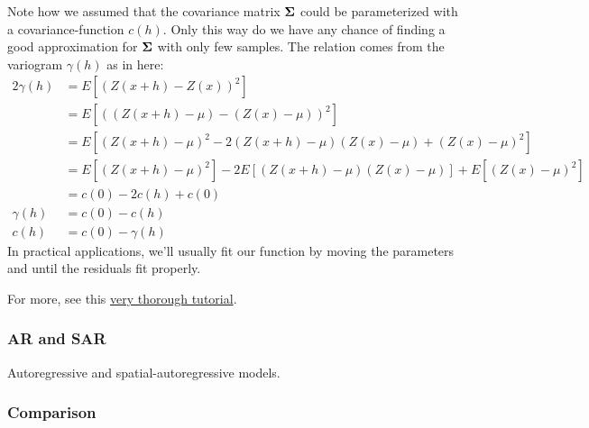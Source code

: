 Note how we assumed that the covariance matrix $\mathbf{\Sigma}$ could be parameterized with a covariance-function $c(h)$. Only this way do we have any chance of finding a good approximation for $\mathbf{\Sigma}$ with only few samples.
The relation  comes from the variogram $\gamma(h)$ as in here:
\begin{equation}
  \begin{aligned}
    2 \gamma(h) &= E[(Z(x+h) - Z(x))^2] \\
                &= E[( (Z(x+h) - \mu) - (Z(x) - \mu) )^2] \\
                &= E[ (Z(x+h) - \mu)^2  - 2(Z(x+h) - \mu)(Z(x) - \mu)  + (Z(x) - \mu)^2 ] \\
                &= E[ (Z(x+h) - \mu)^2 ]  - 2 E[(Z(x+h) - \mu)(Z(x) - \mu)]  + E[ (Z(x) - \mu)^2 ] \\
                &= c(0) - 2 c(h) + c(0) \\
      \gamma(h) &= c(0) - c(h) \\
           c(h) &= c(0) - \gamma(h)
  \end{aligned}
\end{equation}
In practical applications, we'll usually fit our function  by moving the parameters  and  until the residuals fit properly.

For more, see this \href{https://michaeloneill.github.io/GPR-tutorial.html}{very thorough tutorial}.

\subsubsection{AR and SAR}
Autoregressive and spatial-autoregressive models.

\subsubsection{Comparison}

